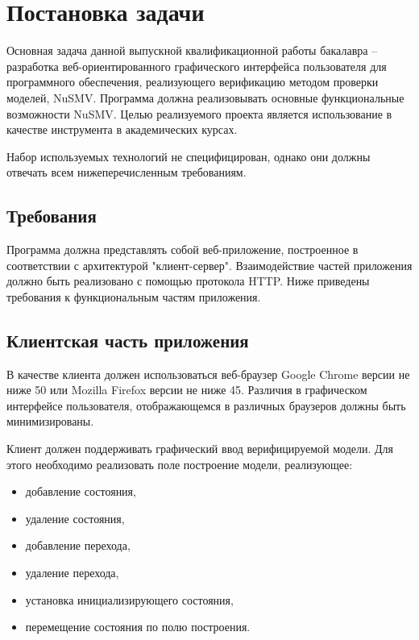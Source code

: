 \chapter{Постановка задачи}

Основная задача данной выпускной квалификационной работы бакалавра -- разработка веб-ориентированного графического интерфейса пользователя для программного обеспечения, реализующего верификацию методом проверки моделей, NuSMV. Программа должна реализовывать основные функциональные возможности NuSMV. Целью реализуемого проекта является использование в качестве инструмента в академических курсах.

Набор используемых технологий не специфицирован, однако они должны отвечать всем нижеперечисленным требованиям.

\section{Требования}

Программа должна представлять собой веб-приложение, построенное в соответствии с архитектурой "клиент-сервер". Взаимодействие частей приложения должно быть реализовано с помощью протокола HTTP. Ниже приведены требования к функциональным частям приложения.

\section{Клиентская часть приложения}

В качестве клиента должен использоваться веб-браузер Google Chrome версии не ниже 50 или Mozilla Firefox версии не ниже 45. Различия в графическом интерфейсе пользователя, отображающемся в различных браузеров должны быть минимизированы. 

Клиент должен поддерживать графический ввод верифицируемой модели. Для этого необходимо реализовать поле построение модели, реализующее:

\begin{itemize}
	\item добавление состояния,
	\item удаление состояния,
	\item добавление перехода,
	\item удаление перехода,
	\item установка инициализирующего состояния,
	\item перемещение состояния по полю построения.
\end{itemize}

